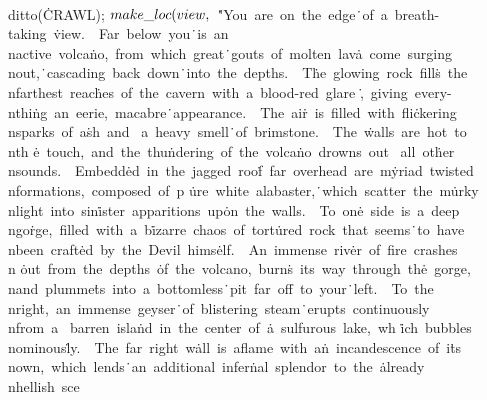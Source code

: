 \\{ditto}(\.{CRAWL});\7
${}\\{make\_loc}(\\{view},{}$\6
\.{"You\ are\ on\ the\ edge}\)\.{\ of\ a\ breath-taking\ }\)\.{view.\ \ Far\
below\ you}\)\.{\ is\ an\\nactive\ volca}\)\.{no,\ from\ which\ great}\)\.{\
gouts\ of\ molten\ lav}\)\.{a\ come\ surging\\nout,}\)\.{\ cascading\ back\
down}\)\.{\ into\ the\ depths.\ \ T}\)\.{he\ glowing\ rock\ fill}\)\.{s\ the%
\\nfarthest\ reac}\)\.{hes\ of\ the\ cavern\ wi}\)\.{th\ a\ blood-red\ glare}\)%
\.{,\ giving\ every-\\nthi}\)\.{ng\ an\ eerie,\ macabre}\)\.{\ appearance.\ \
The\ ai}\)\.{r\ is\ filled\ with\ fli}\)\.{ckering\\nsparks\ of\ a}\)\.{sh\ and%
\ a\ heavy\ smell}\)\.{\ of\ brimstone.\ \ The\ }\)\.{walls\ are\ hot\ to\\nth}%
\)\.{e\ touch,\ and\ the\ thu}\)\.{ndering\ of\ the\ volca}\)\.{no\ drowns\ out%
\ all\ ot}\)\.{her\\nsounds.\ \ Embedd}\)\.{ed\ in\ the\ jagged\ roo}\)\.{f\
far\ overhead\ are\ m}\)\.{yriad\ twisted\\nforma}\)\.{tions,\ composed\ of\ p}%
\)\.{ure\ white\ alabaster,}\)\.{\ which\ scatter\ the\ m}\)\.{urky\\nlight\
into\ sin}\)\.{ister\ apparitions\ up}\)\.{on\ the\ walls.\ \ To\ on}\)\.{e\
side\ is\ a\ deep\\ngo}\)\.{rge,\ filled\ with\ a\ b}\)\.{izarre\ chaos\ of\
tort}\)\.{ured\ rock\ that\ seems}\)\.{\ to\ have\\nbeen\ craft}\)\.{ed\ by\
the\ Devil\ hims}\)\.{elf.\ \ An\ immense\ riv}\)\.{er\ of\ fire\ crashes\\n}\)%
\.{out\ from\ the\ depths\ }\)\.{of\ the\ volcano,\ burn}\)\.{s\ its\ way\
through\ th}\)\.{e\ gorge,\\nand\ plumme}\)\.{ts\ into\ a\ bottomless}\)\.{\
pit\ far\ off\ to\ your}\)\.{\ left.\ \ To\ the\\nrigh}\)\.{t,\ an\ immense\
geyser}\)\.{\ of\ blistering\ steam}\)\.{\ erupts\ continuously}\)\.{\\nfrom\ a%
\ barren\ isla}\)\.{nd\ in\ the\ center\ of\ }\)\.{a\ sulfurous\ lake,\ wh}\)%
\.{ich\ bubbles\\nominous}\)\.{ly.\ \ The\ far\ right\ w}\)\.{all\ is\ aflame\
with\ a}\)\.{n\ incandescence\ of\ i}\)\.{ts\\nown,\ which\ lends}\)\.{\ an\
additional\ infer}\)\.{nal\ splendor\ to\ the\ }\)\.{already\\nhellish\ sce}\)%
